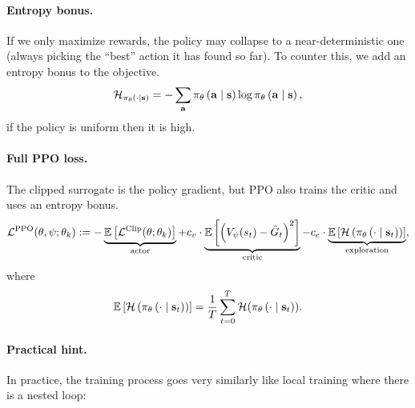 \documentclass[11pt]{article}  %
\begin{document}
\paragraph{Entropy bonus.}
If we only maximize rewards, the policy may collapse to a near-deterministic one (always picking the “best” action it has found so far).
To counter this, we add an entropy bonus to the objective.
\begin{align*}
  \mathcal{H}_{\pi_{\theta}\left( \cdot \mid \mathbf{s} \right)} = -\sum_{\mathbf{a}} \pi_{\theta}\left( \mathbf{a} \mid \mathbf{s} \right) \log \pi_{\theta}\left( \mathbf{a} \mid \mathbf{s} \right),
\end{align*}
if the policy is uniform then it is high.


\paragraph{Full PPO loss.}
The clipped surrogate is the policy gradient, but PPO also trains the critic and uses an entropy bonus.
\begin{align*}
  \mathcal{L}^{\text{PPO}}(\theta, \psi; \theta_k) := -\underbrace{\mathbb{E}\left[\mathcal{L}^{\text{Clip}}(\theta; \theta_k)\right]}_{\text{actor}} + c_v \cdot \underbrace{\mathbb{E}\left[\left( V_{\psi}(s_t) - \hat{G}_t \right)^2\right]}_{\text{critic}} - c_e \cdot \underbrace{\mathbb{E}\left[\mathcal{H}\left( \pi_{\theta}\left( \cdot \mid \mathbf{s}_t \right) \right)\right]}_{\text{exploration}},
\end{align*}
where 
\begin{align*}
  \mathbb{E}\left[\mathcal{H}\left( \pi_{\theta}\left( \cdot \mid \mathbf{s}_t \right) \right)\right] = \frac{1}{T}\sum_{t=0}^{T}\mathcal{H}(\pi_{\theta}\left( \cdot \mid \mathbf{s}_t \right)).
\end{align*}



\paragraph{Practical hint.} 
In practice, the training process goes very similarly like local training where there is a nested loop:
\end{document}
